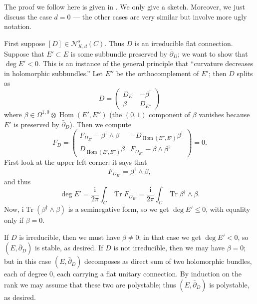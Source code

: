 \documentclass[12pt,letterpaper,reqno]{article}
\numberwithin{equation}{section}
\newcommand{\cN}{\ensuremath{\mathcal N}}
\newcommand{\I}{{\mathrm i}}
\DeclareMathOperator{\Tr}{Tr}
\DeclareMathOperator{\Hom}{Hom}
\begin{document}
\begin{pf} The proof we follow here is given in \cite{MR710055}.
We only give a sketch.
Moreover, we just discuss the case $d=0$ --- the other cases are
very similar but involve more ugly notation.

First suppose $[D] \in \cN^s_{K,d}(C)$. Thus $D$
is an irreducible flat connection. Suppose that $E' \subset E$ is some
subbundle preserved by $\bar\partial_D$; we want to show that $\deg E' < 0$.
This is an instance of the general principle that ``curvature decreases
in holomorphic subbundles.''
Let $E''$ be the orthocomplement of $E'$; then $D$ splits as
\begin{equation} \label{eq:connection-split}
  D = \begin{pmatrix} D_{E'} & - \beta^\dagger \\ \beta & D_{E''} \end{pmatrix}
\end{equation}
where $\beta \in \Omega^{1,0} \otimes \Hom(E',E'')$ (the $(0,1)$ component
of $\beta$ vanishes because $E'$ is preserved by $\bar\partial_D$).
Then we compute
\begin{equation} \label{eq:extension-curvature}
  F_D = \begin{pmatrix} F_{D_{E'}} - \beta^\dagger \wedge \beta & - D_{\Hom(E'',E')} \beta^\dagger \\ D_{\Hom(E',E'')} \beta & F_{D_{E''}} - \beta \wedge \beta^\dagger \end{pmatrix} = 0.
\end{equation}
First look at the upper left corner: it says that
\begin{equation}
  F_{D_{E'}} = \beta^\dagger \wedge \beta,
\end{equation}
and thus
\begin{equation}
 \deg E' = \frac{\I}{2 \pi} \int_C \Tr F_{D_{E'}} = \frac{\I}{2 \pi} \int_C \Tr \beta^\dagger \wedge \beta.
\end{equation}
Now, $\I \Tr (\beta^\dagger \wedge \beta)$ is a seminegative form,
so we get $\deg E' \le 0$, with equality only if $\beta = 0$.

If $D$ is irreducible, then
we must have $\beta \neq 0$; in that case we get $\deg E' < 0$,
so $(E,\bar\partial_D)$ is stable, as desired.
If $D$ is not irreducible, then we may have $\beta = 0$;
but in this case $(E,\bar\partial_D)$ decomposes as direct sum
of two holomorphic bundles, each of degree $0$, each carrying a
flat unitary connection. By induction on the rank we may assume
that these two are polystable; thus
$(E,\bar\partial_D)$ is polystable, as desired.


\end{pf}
\end{document}
